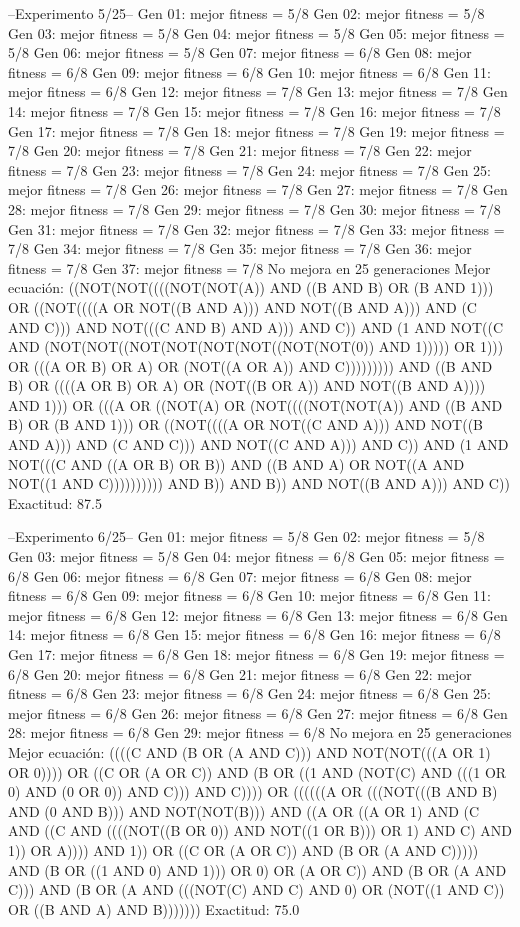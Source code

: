 --Experimento 
 5/25--
Gen 01: mejor fitness = 5/8
Gen 02: mejor fitness = 5/8
Gen 03: mejor fitness = 5/8
Gen 04: mejor fitness = 5/8
Gen 05: mejor fitness = 5/8
Gen 06: mejor fitness = 5/8
Gen 07: mejor fitness = 6/8
Gen 08: mejor fitness = 6/8
Gen 09: mejor fitness = 6/8
Gen 10: mejor fitness = 6/8
Gen 11: mejor fitness = 6/8
Gen 12: mejor fitness = 7/8
Gen 13: mejor fitness = 7/8
Gen 14: mejor fitness = 7/8
Gen 15: mejor fitness = 7/8
Gen 16: mejor fitness = 7/8
Gen 17: mejor fitness = 7/8
Gen 18: mejor fitness = 7/8
Gen 19: mejor fitness = 7/8
Gen 20: mejor fitness = 7/8
Gen 21: mejor fitness = 7/8
Gen 22: mejor fitness = 7/8
Gen 23: mejor fitness = 7/8
Gen 24: mejor fitness = 7/8
Gen 25: mejor fitness = 7/8
Gen 26: mejor fitness = 7/8
Gen 27: mejor fitness = 7/8
Gen 28: mejor fitness = 7/8
Gen 29: mejor fitness = 7/8
Gen 30: mejor fitness = 7/8
Gen 31: mejor fitness = 7/8
Gen 32: mejor fitness = 7/8
Gen 33: mejor fitness = 7/8
Gen 34: mejor fitness = 7/8
Gen 35: mejor fitness = 7/8
Gen 36: mejor fitness = 7/8
Gen 37: mejor fitness = 7/8
No mejora en 25 generaciones
Mejor ecuación: ((NOT(NOT((((NOT(NOT(A)) AND ((B AND B) OR (B AND 1))) OR ((NOT((((A OR NOT((B AND A))) AND NOT((B AND A))) AND (C AND C))) AND NOT(((C AND B) AND A))) AND C)) AND (1 AND NOT((C AND (NOT(NOT((NOT(NOT(NOT(NOT((NOT(NOT(0)) AND 1))))) OR 1))) OR (((A OR B) OR A) OR (NOT((A OR A)) AND C))))))))) AND ((B AND B) OR ((((A OR B) OR A) OR (NOT((B OR A)) AND NOT((B AND A)))) AND 1))) OR (((A OR ((NOT(A) OR (NOT((((NOT(NOT(A)) AND ((B AND B) OR (B AND 1))) OR ((NOT((((A OR NOT((C AND A))) AND NOT((B AND A))) AND (C AND C))) AND NOT((C AND A))) AND C)) AND (1 AND NOT(((C AND ((A OR B) OR B)) AND ((B AND A) OR NOT((A AND NOT((1 AND C)))))))))) AND B)) AND B)) AND NOT((B AND A))) AND C))
 Exactitud: 87.5%

--Experimento 
 6/25--
Gen 01: mejor fitness = 5/8
Gen 02: mejor fitness = 5/8
Gen 03: mejor fitness = 5/8
Gen 04: mejor fitness = 6/8
Gen 05: mejor fitness = 6/8
Gen 06: mejor fitness = 6/8
Gen 07: mejor fitness = 6/8
Gen 08: mejor fitness = 6/8
Gen 09: mejor fitness = 6/8
Gen 10: mejor fitness = 6/8
Gen 11: mejor fitness = 6/8
Gen 12: mejor fitness = 6/8
Gen 13: mejor fitness = 6/8
Gen 14: mejor fitness = 6/8
Gen 15: mejor fitness = 6/8
Gen 16: mejor fitness = 6/8
Gen 17: mejor fitness = 6/8
Gen 18: mejor fitness = 6/8
Gen 19: mejor fitness = 6/8
Gen 20: mejor fitness = 6/8
Gen 21: mejor fitness = 6/8
Gen 22: mejor fitness = 6/8
Gen 23: mejor fitness = 6/8
Gen 24: mejor fitness = 6/8
Gen 25: mejor fitness = 6/8
Gen 26: mejor fitness = 6/8
Gen 27: mejor fitness = 6/8
Gen 28: mejor fitness = 6/8
Gen 29: mejor fitness = 6/8
No mejora en 25 generaciones
Mejor ecuación: ((((C AND (B OR (A AND C))) AND NOT(NOT(((A OR 1) OR 0)))) OR ((C OR (A OR C)) AND (B OR ((1 AND (NOT(C) AND (((1 OR 0) AND (0 OR 0)) AND C))) AND C)))) OR ((((((A OR (((NOT(((B AND B) AND (0 AND B))) AND NOT(NOT(B))) AND ((A OR ((A OR 1) AND (C AND ((C AND ((((NOT((B OR 0)) AND NOT((1 OR B))) OR 1) AND C) AND 1)) OR A)))) AND 1)) OR ((C OR (A OR C)) AND (B OR (A AND C))))) AND (B OR ((1 AND 0) AND 1))) OR 0) OR (A OR C)) AND (B OR (A AND C))) AND (B OR (A AND (((NOT(C) AND C) AND 0) OR (NOT((1 AND C)) OR ((B AND A) AND B)))))))
 Exactitud: 75.0%

